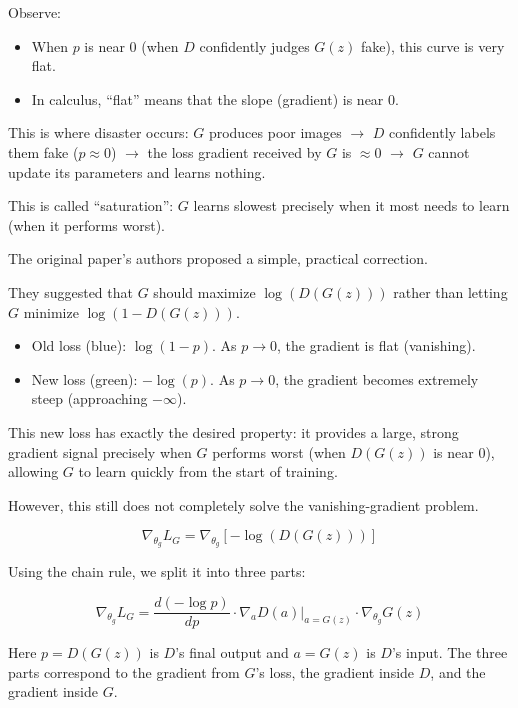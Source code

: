 Observe:

\begin{itemize}
\tightlist
\item
  When \(p\) is near 0 (when \(D\) confidently judges \(G(z)\) fake), this curve is very flat.
\item
  In calculus, ``flat'' means that the slope (gradient) is near 0.
\end{itemize}

This is where disaster occurs: \(G\) produces poor images \(\rightarrow\) \(D\) confidently labels them fake (\(p\approx 0\)) \(\rightarrow\) the loss gradient received by \(G\) is \(\approx 0\) \(\rightarrow\) \(G\) cannot update its parameters and learns nothing.

This is called ``saturation'': \(G\) learns slowest precisely when it most needs to learn (when it performs worst).

The original paper's authors proposed a simple, practical correction.

They suggested that \(G\) should maximize \(\log(D(G(z)))\) rather than letting \(G\) minimize \(\log(1-D(G(z)))\).

\begin{itemize}
\tightlist
\item
  Old loss (blue): \(\log(1-p)\). As \(p \rightarrow 0\), the gradient is flat (vanishing).
\item
  New loss (green): \(-\log(p)\). As \(p \rightarrow 0\), the gradient becomes extremely steep (approaching \(-\infty\)).
\end{itemize}

This new loss has exactly the desired property: it provides a large, strong gradient signal precisely when \(G\) performs worst (when \(D(G(z))\) is near 0), allowing \(G\) to learn quickly from the start of training.

However, this still does not completely solve the vanishing-gradient problem.

\[
\nabla_{\theta_g} L_G = \nabla_{\theta_g}[-\log(D(G(z)))]
\]

Using the chain rule, we split it into three parts:

\[
\nabla_{\theta_g} L_G =
\frac{d(-\log p)}{dp}
\cdot
\nabla_a D(a)\rvert_{a=G(z)}
\cdot
\nabla_{\theta_g} G(z)
\]

Here \(p=D(G(z))\) is \(D\)'s final output and \(a=G(z)\) is \(D\)'s input. The three parts correspond to the gradient from \(G\)'s loss, the gradient inside \(D\), and the gradient inside \(G\).

